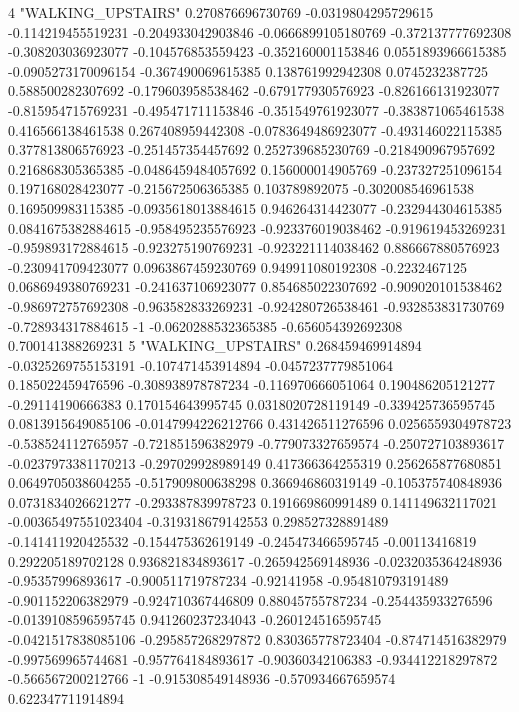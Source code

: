 4 "WALKING_UPSTAIRS" 0.270876696730769 -0.0319804295729615 -0.114219455519231 -0.204933042903846 -0.0666899105180769 -0.372137777692308 -0.308203036923077 -0.104576853559423 -0.352160001153846 0.0551893966615385 -0.0905273170096154 -0.367490069615385 0.138761992942308 0.0745232387725 0.588500282307692 -0.179603958538462 -0.679177930576923 -0.826166131923077 -0.815954715769231 -0.495471711153846 -0.351549761923077 -0.383871065461538 0.416566138461538 0.267408959442308 -0.0783649486923077 -0.493146022115385 0.377813806576923 -0.251457354457692 0.252739685230769 -0.218490967957692 0.216868305365385 -0.0486459484057692 0.156000014905769 -0.237327251096154 0.197168028423077 -0.215672506365385 0.103789892075 -0.302008546961538 0.169509983115385 -0.0935618013884615 0.946264314423077 -0.232944304615385 0.0841675382884615 -0.958495235576923 -0.923376019038462 -0.919619453269231 -0.959893172884615 -0.923275190769231 -0.923221114038462 0.886667880576923 -0.230941709423077 0.0963867459230769 0.949911080192308 -0.2232467125 0.0686949380769231 -0.241637106923077 0.854685022307692 -0.909020101538462 -0.986972757692308 -0.963582833269231 -0.924280726538461 -0.932853831730769 -0.728934317884615 -1 -0.0620288532365385 -0.656054392692308 0.700141388269231
5 "WALKING_UPSTAIRS" 0.268459469914894 -0.0325269755153191 -0.107471453914894 -0.0457237779851064 0.185022459476596 -0.308938978787234 -0.116970666051064 0.190486205121277 -0.29114190666383 0.170154643995745 0.0318020728119149 -0.339425736595745 0.0813915649085106 -0.0147994226212766 0.431426511276596 0.0256559304978723 -0.538524112765957 -0.721851596382979 -0.779073327659574 -0.250727103893617 -0.0237973381170213 -0.297029928989149 0.417366364255319 0.256265877680851 0.0649705038604255 -0.517909800638298 0.366946860319149 -0.105375740848936 0.0731834026621277 -0.293387839978723 0.191669860991489 0.141149632117021 -0.00365497551023404 -0.319318679142553 0.298527328891489 -0.141411920425532 -0.154475362619149 -0.245473466595745 -0.00113416819 0.292205189702128 0.936821834893617 -0.265942569148936 -0.0232035364248936 -0.95357996893617 -0.900511719787234 -0.92141958 -0.954810793191489 -0.901152206382979 -0.924710367446809 0.88045755787234 -0.254435933276596 -0.0139108596595745 0.941260237234043 -0.260124516595745 -0.0421517838085106 -0.295857268297872 0.830365778723404 -0.874714516382979 -0.997569965744681 -0.957764184893617 -0.90360342106383 -0.934412218297872 -0.566567200212766 -1 -0.915308549148936 -0.570934667659574 0.622347711914894
